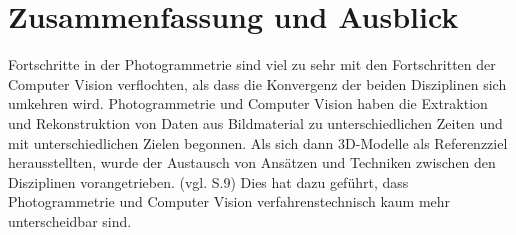 \chapter{Zusammenfassung und Ausblick}


Fortschritte in der Photogrammetrie sind viel zu sehr mit den Fortschritten der Computer Vision verflochten, als dass die Konvergenz der beiden Disziplinen sich umkehren wird. Photogrammetrie und Computer Vision haben die Extraktion und Rekonstruktion von Daten aus Bildmaterial zu unterschiedlichen Zeiten und mit unterschiedlichen Zielen begonnen. Als sich dann 3D-Modelle als Referenzziel herausstellten, wurde der Austausch von Ansätzen und Techniken zwischen den Disziplinen vorangetrieben. (vgl. \cite{state_of_art} S.9) Dies hat dazu geführt, dass Photogrammetrie und Computer Vision verfahrenstechnisch kaum mehr unterscheidbar sind.
	
